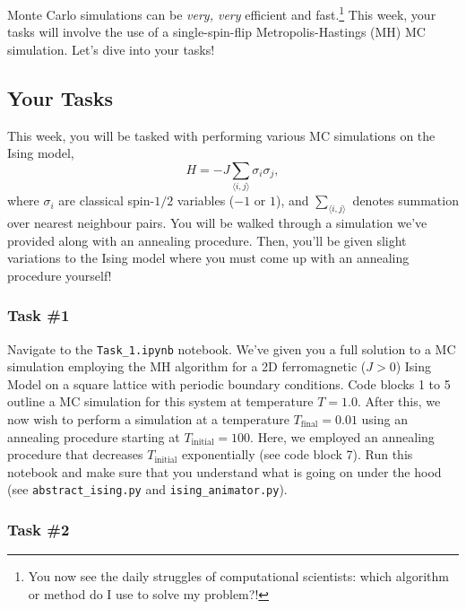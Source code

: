 \documentclass[12pt]{article}
\begin{document}
Monte Carlo simulations can be {\it very, very} efficient and fast.\footnote{You now see the daily struggles of computational scientists: which algorithm or method do I use to solve my problem?!} This week, your tasks will involve the use of a single-spin-flip Metropolis-Hastings (MH) MC simulation. Let's dive into your tasks!

\subsection*{Your Tasks}

This week, you will be tasked with performing various MC simulations on the Ising model,
\begin{equation}
    H = -J\sum_{\langle i,j \rangle} \sigma_i \sigma_j,
\end{equation}
where $\sigma_i$ are classical spin-$1/2$ variables ($-1$ or $1$), and $\sum_{\langle i,j \rangle}$ denotes summation over nearest neighbour pairs. You will be walked through a simulation we've provided along with an annealing procedure. Then, you'll be given slight variations to the Ising model where you must come up with an annealing procedure yourself!

\subsubsection*{Task \#1}

Navigate to the \texttt{Task\_1.ipynb} notebook. We've given you a full solution to a MC simulation employing the MH algorithm for a 2D ferromagnetic ($J > 0$) Ising Model on a square lattice with periodic boundary conditions. Code blocks 1 to 5 outline a MC simulation for this system at temperature $T = 1.0$. After this, we now wish to perform a simulation at a temperature $T_{\text{final}} = 0.01$ using an annealing procedure starting at $T_{\text{initial}} = 100$. Here, we employed an annealing procedure that decreases $T_{\text{initial}}$ exponentially (see code block 7). Run this notebook and make sure that you understand what is going on under the hood (see \texttt{abstract\_ising.py} and \texttt{ising\_animator.py}).

\subsubsection*{Task \#2}
\end{document}
